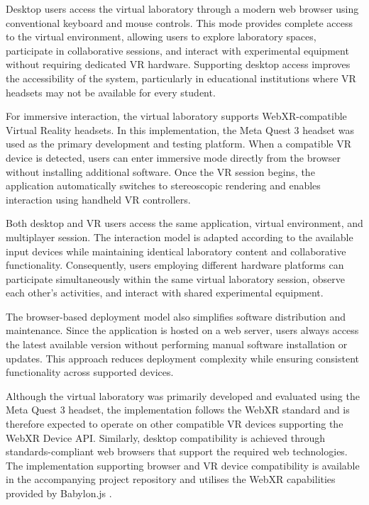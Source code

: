 Desktop users access the virtual laboratory through a modern web browser using conventional keyboard and mouse controls. This mode provides complete access to the virtual environment, allowing users to explore laboratory spaces, participate in collaborative sessions, and interact with experimental equipment without requiring dedicated VR hardware. Supporting desktop access improves the accessibility of the system, particularly in educational institutions where VR headsets may not be available for every student.

For immersive interaction, the virtual laboratory supports WebXR-compatible Virtual Reality headsets. In this implementation, the Meta Quest 3 headset was used as the primary development and testing platform. When a compatible VR device is detected, users can enter immersive mode directly from the browser without installing additional software. Once the VR session begins, the application automatically switches to stereoscopic rendering and enables interaction using handheld VR controllers.

Both desktop and VR users access the same application, virtual environment, and multiplayer session. The interaction model is adapted according to the available input devices while maintaining identical laboratory content and collaborative functionality. Consequently, users employing different hardware platforms can participate simultaneously within the same virtual laboratory session, observe each other's activities, and interact with shared experimental equipment.

The browser-based deployment model also simplifies software distribution and maintenance. Since the application is hosted on a web server, users always access the latest available version without performing manual software installation or updates. This approach reduces deployment complexity while ensuring consistent functionality across supported devices.

Although the virtual laboratory was primarily developed and evaluated using the Meta Quest 3 headset, the implementation follows the WebXR standard and is therefore expected to operate on other compatible VR devices supporting the WebXR Device API. Similarly, desktop compatibility is achieved through standards-compliant web browsers that support the required web technologies. The implementation supporting browser and VR device compatibility is available in the accompanying project repository \cite{thesisRepo} and utilises the WebXR capabilities provided by Babylon.js \cite{babylonWebXR}.

